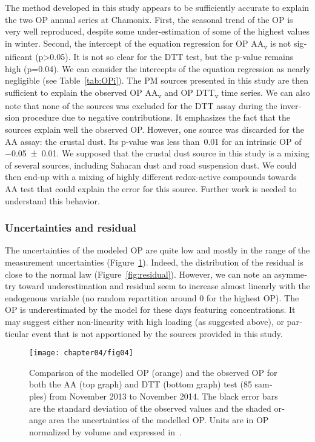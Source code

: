 \begin{otherlanguage}{english}
The method developed in this study appears to be sufficiently accurate
to explain the two OP annual series at Chamonix. First, the seasonal
trend of the OP is very well reproduced, despite some under-estimation
of some of the highest values in winter. Second, the intercept of the
equation regression for OP AA\textsubscript{v} is not significant
(p\textgreater{}0.05). It is not so clear for the DTT test, but the
p-value remains high (p=0.04). We can consider the intercepts of the
equation regression as nearly negligible (see Table~\ref{tab:OPi}). The PM sources
presented in this study are then sufficient to explain the observed OP
AA\textsubscript{v} and OP DTT\textsubscript{v} time series. We can also
note that none of the sources was excluded for the DTT assay during the
inversion procedure due to negative contributions. It emphasizes the
fact that the sources explain well the observed OP. However, one source
was discarded for the AA assay: the crustal dust. Its p-value was less
than~0.01 for an intrinsic OP of \SI{-0.05(1)}{\opm}. We supposed that the
crustal dust source in this study is a mixing of several sources,
including Saharan dust and road suspension dust. We could then end-up
with a mixing of highly different redox-active compounds towards AA test
that could explain the error for this source. Further work is needed to
understand this behavior.

\subsubsection{Uncertainties and residual}\label{uncertainties-and-residual}

The uncertainties of the modeled OP are quite low and mostly in the range of the
measurement uncertainties (Figure~\ref{fig:TSobsvsmodel}). Indeed, the
distribution of the residual is close to the normal law
(Figure~\ref{fig:residual}).  However, we can note an asymmetry toward
underestimation and residual seem to increase almost linearly with the
endogenous variable (no random repartition around 0 for the highest OP). The OP
is underestimated by the model for these days featuring concentrations. It may suggest
either non-linearity with high loading (as suggested above), or particular event
that is not apportioned by the sources provided in this study.

\begin{figure}[ht]
    \centering
    \texttt{[image: chapter04/fig04]}
    \caption{Comparison of the modelled OP (orange) and the observed OP for both
        the AA (top graph) and DTT (bottom graph) test (85 samples) from
        November 2013 to November 2014. The black error bars are the standard
        deviation of the observed values and the shaded orange area the
    uncertainties of the modelled OP.  Units are in OP normalized by volume
    and expressed in~\si{\opv}.}
    \label{fig:TSobsvsmodel}
\end{figure}


\end{otherlanguage}
